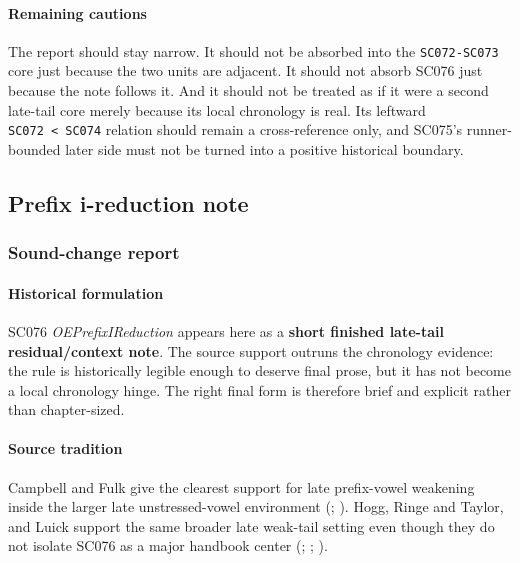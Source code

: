 \documentclass[
  british,
  a4paper,
]{article}
\begin{document}
\paragraph{Remaining cautions}\label{remaining-cautions-46}

The report should stay narrow. It should not be absorbed into the
\texttt{SC072-SC073} core just because the two units are adjacent. It
should not absorb SC076 just because the note follows it. And it should
not be treated as if it were a second late-tail core merely because its
local chronology is real. Its leftward
\texttt{SC072\ \textless{}\ SC074} relation should remain a
cross-reference only, and SC075's runner-bounded later side must not be
turned into a positive historical boundary.

\subsection{Prefix i-reduction note}\label{prefix-i-reduction-note}

\subsubsection{Sound-change report}\label{sound-change-report-47}

\paragraph{Historical formulation}\label{historical-formulation-47}

SC076 \emph{OEPrefixIReduction} appears here as a \textbf{short finished
late-tail residual/context note}. The source support outruns the
chronology evidence: the rule is historically legible enough to deserve
final prose, but it has not become a local chronology hinge. The right
final form is therefore brief and explicit rather than chapter-sized.

\paragraph{Source tradition}\label{source-tradition-47}

Campbell and Fulk give the clearest support for late prefix-vowel
weakening inside the larger late unstressed-vowel environment
(;
). Hogg, Ringe and
Taylor, and Luick support the same broader late weak-tail setting even
though they do not isolate SC076 as a major handbook center
(;
; ).
\end{document}
